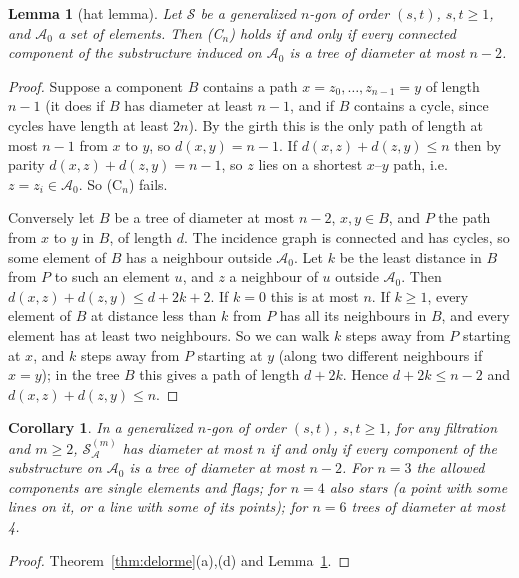 \documentclass[11pt]{amsart}
\newtheorem{lemma}[theorem]{Lemma}
\newtheorem{corollary}[theorem]{Corollary}
\theoremstyle{definition}
\theoremstyle{remark}
\numberwithin{equation}{section}
\newcommand{\cA}{\mathcal A}
\newcommand{\cS}{\mathcal S}
\begin{document}
\begin{lemma}[hat lemma]\label{lem:hat}
Let $\cS$ be a generalized $n$-gon of order $(s,t)$, $s,t\ge1$, and $\cA_0$ a set of elements. Then (C$_n$) holds if
and only if every connected component of the substructure induced on $\cA_0$ is a tree of diameter at most $n-2$.
\end{lemma}

\begin{proof}
Suppose a component $B$ contains a path $x=z_0,\dots,z_{n-1}=y$ of length $n-1$ (it does if $B$ has diameter at least
$n-1$, and if $B$ contains a cycle, since cycles have length at least $2n$). By the girth this is the only path of
length at most $n-1$ from $x$ to $y$, so $d(x,y)=n-1$. If $d(x,z)+d(z,y)\le n$ then by parity
$d(x,z)+d(z,y)=n-1$, so $z$ lies on a shortest $x$--$y$ path, i.e.\ $z=z_i\in\cA_0$. So (C$_n$) fails.

Conversely let $B$ be a tree of diameter at most $n-2$, $x,y\in B$, and $P$ the path from $x$ to $y$ in $B$, of length
$d$. The incidence graph is connected and has cycles, so some element of $B$ has a neighbour outside $\cA_0$. Let $k$
be the least distance in $B$ from $P$ to such an element $u$, and $z$ a neighbour of $u$ outside $\cA_0$. Then
$d(x,z)+d(z,y)\le d+2k+2$. If $k=0$ this is at most $n$. If $k\ge1$, every element of $B$ at distance less than $k$ from
$P$ has all its neighbours in $B$, and every element has at least two neighbours. So we can walk $k$ steps away from
$P$ starting at $x$, and $k$ steps away from $P$ starting at $y$ (along two different neighbours if $x=y$); in the tree
$B$ this gives a path of length $d+2k$. Hence $d+2k\le n-2$ and $d(x,z)+d(z,y)\le n$.
\end{proof}

\begin{corollary}\label{cor:hat}
In a generalized $n$-gon of order $(s,t)$, $s,t\ge1$, for any filtration and $m\ge2$, $\cS^{(m)}_\cA$ has diameter at
most $n$ if and only if every component of the substructure on $\cA_0$ is a tree of diameter at most $n-2$. For $n=3$
the allowed components are single elements and flags; for $n=4$ also \emph{stars} (a point with some lines on it, or a
line with some of its points); for $n=6$ trees of diameter at most 4.
\end{corollary}

\begin{proof}
Theorem~\ref{thm:delorme}(a),(d) and Lemma~\ref{lem:hat}.
\end{proof}
\end{document}
